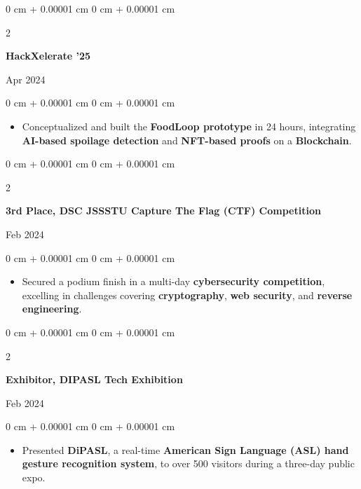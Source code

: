 \documentclass[10pt, letterpaper]{article}
\newenvironment{highlights}{
    \begin{itemize}[
        topsep=0.10 cm,
        parsep=0.10 cm,
        partopsep=0pt,
        itemsep=0pt,
        leftmargin=0 cm + 10pt
    ]
}{
    \end{itemize}
} %
\newenvironment{onecolentry}{
    \begin{adjustwidth}{
        0 cm + 0.00001 cm
    }{
        0 cm + 0.00001 cm
    }
}{
    \end{adjustwidth}
} %
\newenvironment{twocolentry}[2][]{
    \onecolentry
    \def\secondColumn{#2}
    \setcolumnwidth{\fill, 4.5 cm}
    \begin{paracol}{2}
}{
    \switchcolumn \raggedleft \secondColumn
    \end{paracol}
    \endonecolentry
} %
\begin{document}
\vspace{0.2 cm}

\begin{twocolentry}{
    Apr 2024
}
    \textbf{\textcolor{blueHighlight}{HackXelerate '25}}
\end{twocolentry}

\vspace{0.05 cm}
\begin{onecolentry}
    \begin{highlights}
        \item Conceptualized and built the \textbf{FoodLoop prototype} in 24 hours, integrating \textbf{AI-based spoilage detection} and \textbf{NFT-based proofs} on a \textbf{Blockchain}.
    \end{highlights}
\end{onecolentry}

\vspace{0.2 cm}

\begin{twocolentry}{
    Feb 2024
}
    \textbf{\textcolor{blueHighlight}{3rd Place, DSC JSSSTU Capture The Flag (CTF) Competition}}
\end{twocolentry}

\vspace{0.05 cm}
\begin{onecolentry}
    \begin{highlights}
        \item Secured a podium finish in a multi-day \textbf{cybersecurity competition}, excelling in challenges covering \textbf{cryptography}, \textbf{web security}, and \textbf{reverse engineering}.
    \end{highlights}
\end{onecolentry}

\vspace{0.2 cm}

\begin{twocolentry}{
    Feb 2024
}
    \textbf{\textcolor{blueHighlight}{Exhibitor, DIPASL Tech Exhibition}}
\end{twocolentry}

\vspace{0.05 cm}
\begin{onecolentry}
    \begin{highlights}
        \item Presented \textbf{DiPASL}, a real-time \textbf{American Sign Language (ASL) hand gesture recognition system}, to over 500 visitors during a three-day public expo.
    \end{highlights}
\end{onecolentry}
\end{document}
